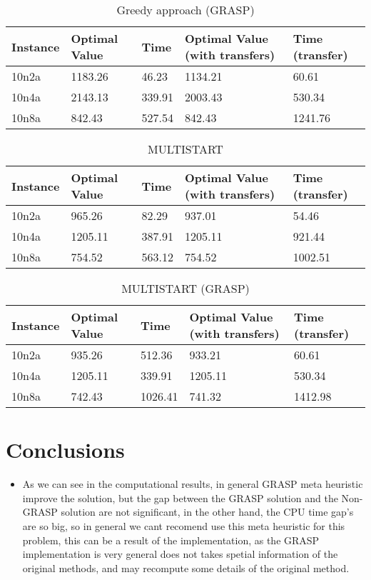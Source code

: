 \documentclass[10pt,twoside]{article}
\begin{document}
\begin{itemize}
\begin{table}[H]
\caption{Greedy approach (GRASP)}
\begin{tabular}{lllll}
  \hline
  Instance & Optimal Value & Time   & Optimal Value (with transfers) & Time (transfer) \\
  \hline
  10n2a    & 1183.26       & 46.23  & 1134.21                        & 60.61  \\
  10n4a    & 2143.13       & 339.91 & 2003.43                        & 530.34 \\
  10n8a    & 842.43        & 527.54 & 842.43                         & 1241.76\\
  \hline
\end{tabular}
\end{table}

\begin{table}[H]
\caption{MULTISTART}
\begin{tabular}{lllll}
  \hline
  Instance & Optimal Value & Time   & Optimal Value (with transfers) & Time (transfer) \\
  \hline
  10n2a    & 965.26        & 82.29  & 937.01                         & 54.46  \\
  10n4a    & 1205.11       & 387.91 & 1205.11                        & 921.44 \\
  10n8a    & 754.52        & 563.12 & 754.52                         & 1002.51\\
  \hline
\end{tabular}
\end{table}

\begin{table}[H]
\caption{MULTISTART (GRASP)}
\begin{tabular}{lllll}
  \hline
  Instance & Optimal Value & Time   & Optimal Value (with transfers) & Time (transfer) \\
  \hline
  10n2a    & 935.26        & 512.36 & 933.21                         & 60.61  \\
  10n4a    & 1205.11       & 339.91 & 1205.11                        & 530.34 \\
  10n8a    & 742.43        & 1026.41& 741.32                         & 1412.98\\
  \hline
\end{tabular}
\end{table}

\section{Conclusions}\label{sec_conclusions}
\begin{itemize}
\item As we can see in the computational results, in general GRASP meta heuristic
  improve the solution, but the gap between the GRASP solution and the Non-GRASP
  solution are not significant, in the other hand, the CPU time gap's are so big,
  so in general we cant recomend use this meta heuristic for this problem, this
  can be a result of the implementation, as the GRASP implementation is very
  general does not takes spetial information of the original methods, and may
  recompute some details of the original method.


\end{itemize}
\end{itemize}
\end{document}
